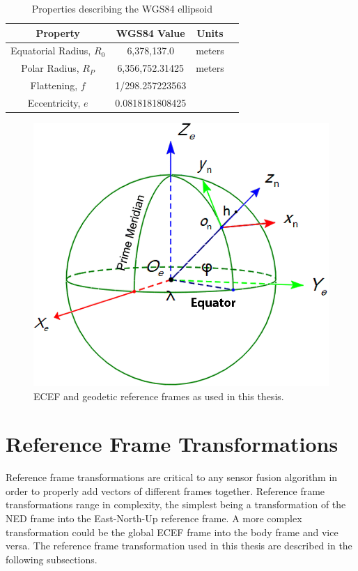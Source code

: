 \begin{table}[!ht]
    \caption{Properties describing the WGS84 ellipsoid}\label{tbl:wgs84}
    \centering
    \begin{tabular}{cccc}
        \toprule
        \textbf{Property}          & \textbf{WGS84 Value} & \textbf{Units} \\
        \midrule
        Equatorial Radius, \(R_0\) & 6,378,137.0          & meters         \\
        Polar Radius, \(R_P\)      & 6,356,752.31425      & meters         \\
        Flattening, \(f\)          & 1/298.257223563      &                \\
        Eccentricity, \(e\)        & 0.0818181808425      &                \\
        \bottomrule
    \end{tabular}
\end{table}

\begin{figure}[!ht]
    \centering
    \includegraphics[width=0.75\linewidth]{Figures/globalframe.png}
    \caption{ECEF and geodetic reference frames as used in this thesis.}\label{fig:globalframes}
\end{figure}

\clearpage
\section{\textbf{Reference Frame Transformations}}
Reference frame transformations are critical to any sensor fusion algorithm in order to properly add vectors of different frames together. Reference frame transformations range in complexity, the simplest being a transformation of the NED frame into the East-North-Up reference frame. A more complex transformation could be the global ECEF frame into the body frame and vice versa. The reference frame transformation used in this thesis are described in the following subsections.

